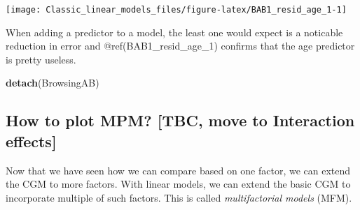 \documentclass[]{svmono}
\newenvironment{Shaded}{\begin{snugshade}}{\end{snugshade}}
\newcommand{\KeywordTok}[1]{\textcolor[rgb]{0.13,0.29,0.53}{\textbf{#1}}}
\newcommand{\DataTypeTok}[1]{\textcolor[rgb]{0.13,0.29,0.53}{#1}}
\newcommand{\DecValTok}[1]{\textcolor[rgb]{0.00,0.00,0.81}{#1}}
\newcommand{\StringTok}[1]{\textcolor[rgb]{0.31,0.60,0.02}{#1}}
\newcommand{\OperatorTok}[1]{\textcolor[rgb]{0.81,0.36,0.00}{\textbf{#1}}}
\newcommand{\NormalTok}[1]{#1}
\begin{document}
\begin{Shaded}
\end{Shaded}

\texttt{[image: Classic\_linear\_models\_files/figure-latex/BAB1\_resid\_age\_1-1]}

When adding a predictor to a model, the least one would expect is a
noticable reduction in error and @ref(BAB1\_resid\_age\_1) confirms that
the age predictor is pretty useless.

\begin{Shaded}
\begin{Highlighting}[]
\KeywordTok{detach}\NormalTok{(BrowsingAB)}
\end{Highlighting}
\end{Shaded}

\subsection{How to plot MPM? {[}TBC, move to Interaction
effects{]}}\label{how-to-plot-mpm-tbc-move-to-interaction-effects}

Now that we have seen how we can compare based on one factor, we can
extend the CGM to more factors. With linear models, we can extend the
basic CGM to incorporate multiple of such factors. This is called
\emph{multifactorial models} (MFM).
\end{document}
